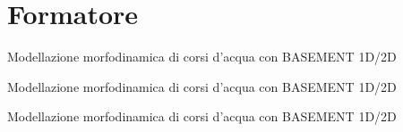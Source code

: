
\section{Formatore}

 Modellazione morfodinamica di corsi d'acqua con BASEMENT 1D/2D
\sectionsep

 Modellazione morfodinamica di corsi d'acqua con BASEMENT 1D/2D
\sectionsep

 Modellazione morfodinamica di corsi d'acqua con BASEMENT 1D/2D
\sectionsep
